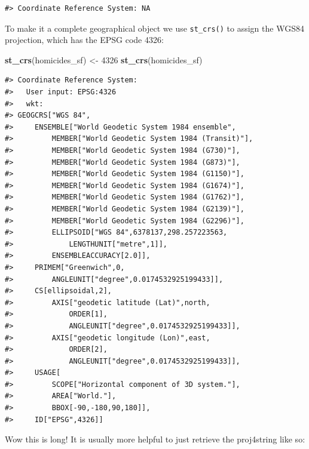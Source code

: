 \documentclass[
]{book}
\newenvironment{Shaded}{\begin{snugshade}}{\end{snugshade}}
\newcommand{\DecValTok}[1]{\textcolor[rgb]{0.00,0.00,0.81}{#1}}
\newcommand{\FunctionTok}[1]{\textcolor[rgb]{0.13,0.29,0.53}{\textbf{#1}}}
\newcommand{\NormalTok}[1]{#1}
\newcommand{\OtherTok}[1]{\textcolor[rgb]{0.56,0.35,0.01}{#1}}
\newcommand{\SpecialCharTok}[1]{\textcolor[rgb]{0.81,0.36,0.00}{\textbf{#1}}}
\begin{document}
\begin{verbatim}
#> Coordinate Reference System: NA
\end{verbatim}

To make it a complete geographical object we use \texttt{st\_crs()} to assign the WGS84 projection, which has the EPSG code 4326:

\begin{Shaded}
\begin{Highlighting}[]
\FunctionTok{st\_crs}\NormalTok{(homicides\_sf) }\OtherTok{\textless{}{-}} \DecValTok{4326}
\FunctionTok{st\_crs}\NormalTok{(homicides\_sf)}
\end{Highlighting}
\end{Shaded}

\begin{verbatim}
#> Coordinate Reference System:
#>   User input: EPSG:4326 
#>   wkt:
#> GEOGCRS["WGS 84",
#>     ENSEMBLE["World Geodetic System 1984 ensemble",
#>         MEMBER["World Geodetic System 1984 (Transit)"],
#>         MEMBER["World Geodetic System 1984 (G730)"],
#>         MEMBER["World Geodetic System 1984 (G873)"],
#>         MEMBER["World Geodetic System 1984 (G1150)"],
#>         MEMBER["World Geodetic System 1984 (G1674)"],
#>         MEMBER["World Geodetic System 1984 (G1762)"],
#>         MEMBER["World Geodetic System 1984 (G2139)"],
#>         MEMBER["World Geodetic System 1984 (G2296)"],
#>         ELLIPSOID["WGS 84",6378137,298.257223563,
#>             LENGTHUNIT["metre",1]],
#>         ENSEMBLEACCURACY[2.0]],
#>     PRIMEM["Greenwich",0,
#>         ANGLEUNIT["degree",0.0174532925199433]],
#>     CS[ellipsoidal,2],
#>         AXIS["geodetic latitude (Lat)",north,
#>             ORDER[1],
#>             ANGLEUNIT["degree",0.0174532925199433]],
#>         AXIS["geodetic longitude (Lon)",east,
#>             ORDER[2],
#>             ANGLEUNIT["degree",0.0174532925199433]],
#>     USAGE[
#>         SCOPE["Horizontal component of 3D system."],
#>         AREA["World."],
#>         BBOX[-90,-180,90,180]],
#>     ID["EPSG",4326]]
\end{verbatim}

Wow this is long! It is usually more helpful to just retrieve the proj4string like so:

\begin{Shaded}
\end{Shaded}
\end{document}
